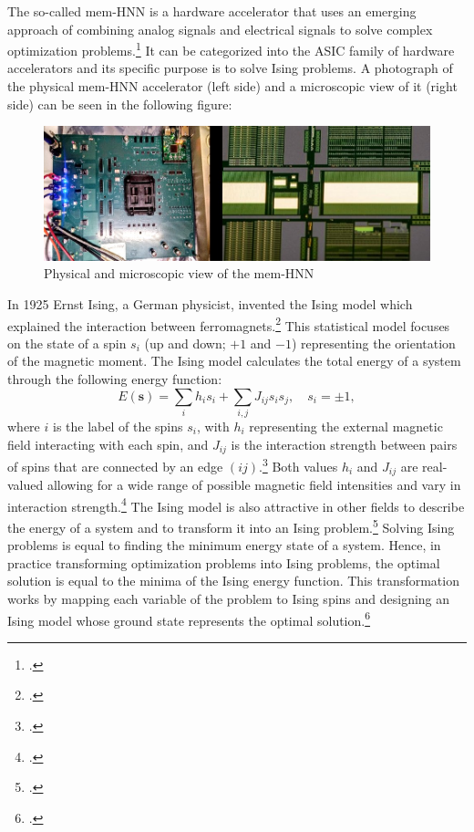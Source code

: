The so-called \ac{mem-HNN} is a hardware accelerator that uses an emerging approach of combining analog signals and electrical signals to solve complex optimization problems.\footcite[cf.][410]{caiPowerefficientCombinatorialOptimization2020}
It can be categorized into the \ac{ASIC} family of hardware accelerators and its specific purpose is to solve Ising problems. 
A photograph of the physical \ac{mem-HNN} accelerator (left side) and a microscopic view of it (right side) can be seen in the following figure: 
\begin{figure}[H]
    \centering
    \includegraphics[width=0.65\linewidth]{graphics/Bilder_physische_beschleuniger.jpg}
    \caption{Physical and microscopic view of the mem-HNN}
\end{figure}
In 1925 Ernst Ising, a German physicist, invented the Ising model which explained the interaction between ferromagnets.\footcite[cf.][253-258]{isingBeitragZurTheorie1925}
This statistical model focuses on the state of a spin \( s_{i} \) (up and down; \( +1 \) and \( -1 \)) representing the orientation of the magnetic moment. 
The Ising model calculates the total energy of a system through the following energy function: 
\begin{equation}
    E(\mathbf{s}) = \sum_{i } h_i s_i + \sum_{i,j} J_{ij}s_{i}s_{j}, \quad s_i = \pm 1,
\end{equation}
where \( i \) is the label of the spins \( s_{i} \), with \( h_{i} \) representing the external magnetic field  interacting with each spin, and \( J_{ij} \) is the interaction strength between pairs of spins that are connected by an edge \( (ij) \).\footcite[cf.][2]{tanahashiApplicationIsingMachines2019}
Both values \( h_{i} \) and  \( J_{ij} \) are real-valued allowing for a wide range of possible magnetic field intensities and vary in interaction strength.\footcite[cf.][1-2]{wangOscillatorbasedIsingMachine2017}
The Ising model is also attractive in other fields to describe the energy of a system and to transform it into an Ising problem.\footcite[cf.][2-3]{tanahashiApplicationIsingMachines2019}
Solving Ising problems is equal to finding the minimum energy state of a system.
Hence, in practice transforming optimization problems into Ising problems, the optimal solution is equal to the minima of the Ising energy function. 
This transformation works by mapping each variable of the problem to Ising spins and designing an Ising model whose ground state represents the optimal solution.\footcite[cf.][2-3]{lucasIsingFormulationsMany2014}

